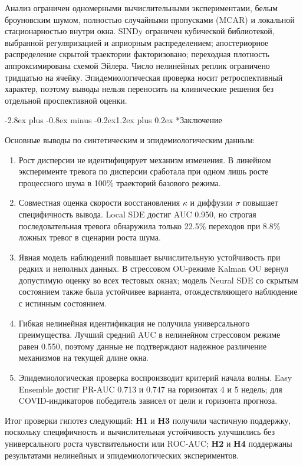 \documentclass[12pt,a4paper]{article}
\makeatletter
\numberwithin{table}{section}
\numberwithin{figure}{section}
\renewcommand\section{\@startsection{section}{1}{0pt}
  {-2.8ex plus -0.8ex minus -0.2ex}{1.2ex plus 0.2ex}
  {\centering\normalfont\normalsize\bfseries}}
\makeatother
\begin{document}
Анализ ограничен одномерными вычислительными экспериментами, белым броуновским шумом,
полностью случайными пропусками (MCAR) и локальной стационарностью внутри окна.
SINDy ограничен кубической библиотекой, выбранной регуляризацией и априорным
распределением; апостериорное распределение скрытой траектории факторизовано;
переходная плотность аппроксимирована схемой Эйлера. Число нелинейных реплик
ограничено тридцатью на ячейку. Эпидемиологическая проверка носит
ретроспективный характер, поэтому выводы нельзя переносить на клинические
решения без отдельной проспективной оценки.

\clearpage
\section*{Заключение}

Основные выводы по синтетическим и эпидемиологическим данным:

\begin{enumerate}
\item Рост дисперсии не идентифицирует механизм изменения. В линейном
эксперименте тревога по дисперсии сработала при одном лишь росте процессного
шума в 100\% траекторий базового режима.
\item Совместная оценка скорости восстановления $\kappa$ и диффузии $\sigma$
повышает специфичность вывода. Local SDE достиг AUC 0.950, но строгая
последовательная тревога обнаружила только 22.5\% переходов при 8.8\% ложных
тревог в сценарии роста шума.
\item Явная модель наблюдений повышает вычислительную устойчивость при редких
и неполных данных. В стрессовом OU-режиме Kalman OU вернул допустимую оценку во
всех тестовых окнах; модель Neural SDE со скрытым состоянием также была
устойчивее варианта, отождествляющего наблюдение с истинным состоянием.
\item Гибкая нелинейная идентификация не получила универсального преимущества.
Лучший средний AUC в нелинейном стрессовом режиме равен 0.550, поэтому данные
не подтверждают надежное различение механизмов на текущей длине окна.
\item Эпидемиологическая проверка воспроизводит критерий начала волны. Easy
Ensemble достиг PR-AUC 0.713 и 0.747 на горизонтах 4 и 5 недель; для
COVID-индикаторов победитель зависел от цели и горизонта прогноза.
\end{enumerate}

Итог проверки гипотез следующий: \textbf{H1} и \textbf{H3} получили частичную
поддержку, поскольку специфичность и вычислительная устойчивость улучшились без
универсального роста чувствительности или ROC-AUC; \textbf{H2} и \textbf{H4}
поддержаны результатами нелинейных и эпидемиологических экспериментов.
\end{document}
